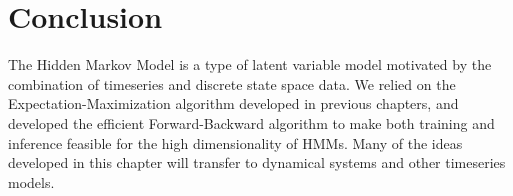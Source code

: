 \section{Conclusion}
The Hidden Markov Model is a type of latent variable model motivated by the combination of timeseries and discrete state space data. We relied on the Expectation-Maximization algorithm developed in previous chapters, and developed the efficient Forward-Backward algorithm to make both training and inference feasible for the high dimensionality of HMMs. Many of the ideas developed in this chapter will transfer to dynamical systems and other timeseries models.